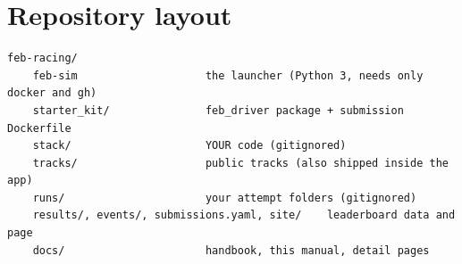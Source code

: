 \documentclass[11pt,a4paper]{article}
\begin{document}
\newpage
\section{Repository layout}

\begin{lstlisting}
feb-racing/
    feb-sim                    the launcher (Python 3, needs only docker and gh)
    starter_kit/               feb_driver package + submission Dockerfile
    stack/                     YOUR code (gitignored)
    tracks/                    public tracks (also shipped inside the app)
    runs/                      your attempt folders (gitignored)
    results/, events/, submissions.yaml, site/    leaderboard data and page
    docs/                      handbook, this manual, detail pages
\end{lstlisting}

\appendix

\end{document}
